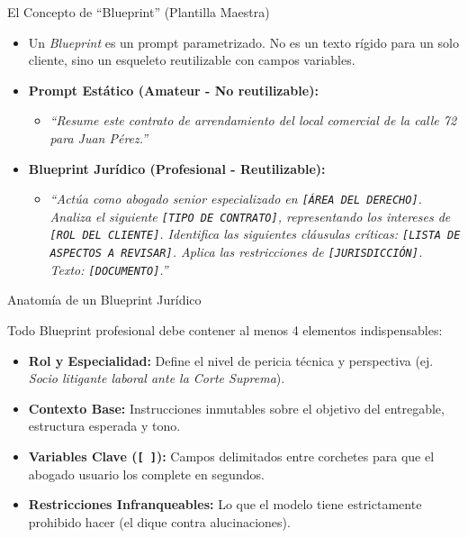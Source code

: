 \documentclass[aspectratio=169]{beamer}
\begin{document}
\begin{frame}{El Concepto de ``Blueprint'' (Plantilla Maestra)}

\begin{itemize}
  \item Un \textit{Blueprint} es un prompt parametrizado. No es un texto rígido para un solo cliente, sino un esqueleto reutilizable con campos variables.
  \item \textbf{Prompt Estático (Amateur - No reutilizable):}
  \begin{itemize}
    \item \textit{``Resume este contrato de arrendamiento del local comercial de la calle 72 para Juan Pérez.''}
  \end{itemize}
  \item \textbf{Blueprint Jurídico (Profesional - Reutilizable):}
  \begin{itemize}
    \item \textit{``Actúa como abogado senior especializado en \texttt{[ÁREA DEL DERECHO]}. Analiza el siguiente \texttt{[TIPO DE CONTRATO]}, representando los intereses de \texttt{[ROL DEL CLIENTE]}. Identifica las siguientes cláusulas críticas: \texttt{[LISTA DE ASPECTOS A REVISAR]}. Aplica las restricciones de \texttt{[JURISDICCIÓN]}. Texto: \texttt{[DOCUMENTO]}.''}
  \end{itemize}
\end{itemize}
\end{frame}

\begin{frame}{Anatomía de un Blueprint Jurídico}

Todo Blueprint profesional debe contener al menos 4 elementos indispensables:
\begin{itemize}
  \item \textbf{Rol y Especialidad:} Define el nivel de pericia técnica y perspectiva (ej. \textit{Socio litigante laboral ante la Corte Suprema}).
  \item \textbf{Contexto Base:} Instrucciones inmutables sobre el objetivo del entregable, estructura esperada y tono.
  \item \textbf{Variables Clave (\texttt{[ ]}):} Campos delimitados entre corchetes para que el abogado usuario los complete en segundos.
  \item \textbf{Restricciones Infranqueables:} Lo que el modelo tiene estrictamente prohibido hacer (el dique contra alucinaciones).
\end{itemize}
\end{frame}
\end{document}
